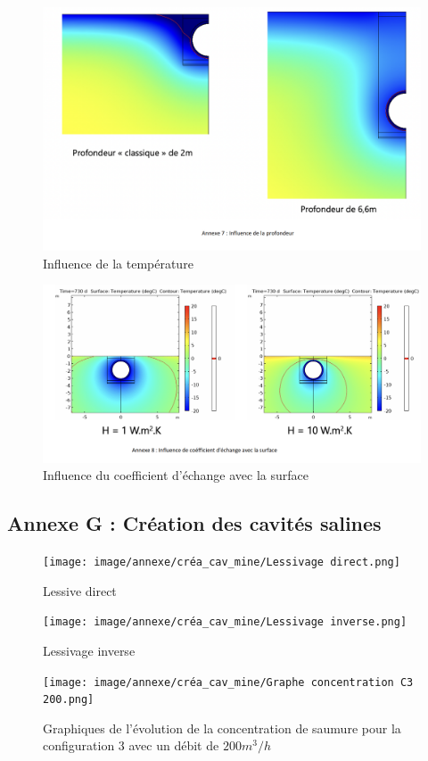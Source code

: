 \documentclass[11pt,french,a4paper]{article}
\begin{document}
\begin{figure}[!h]
\centering
\includegraphics[width=.8\linewidth]{image/annexe/reservoir_ent/Annexe_7.png}
\caption{Influence de la température}
\end{figure}
  
\begin{figure}[!h]
\centering
\includegraphics[width=.8\linewidth]{image/annexe/reservoir_ent/Annexe_9.png}
\caption{Influence du coefficient d'échange avec la surface}
\end{figure}

\FloatBarrier
\newpage
\subsection*{Annexe G : Création des cavités salines} 

\begin{figure}[!h]
  \centering
  \texttt{[image: image/annexe/créa\_cav\_mine/Lessivage direct.png]}
  \caption{Lessive direct}
  \end{figure}

\begin{figure}[!h]
  \centering
  \texttt{[image: image/annexe/créa\_cav\_mine/Lessivage inverse.png]}
  \caption{Lessivage inverse}
  \end{figure}

\begin{figure}[!h]
  \centering
  \texttt{[image: image/annexe/créa\_cav\_mine/Graphe concentration C3 200.png]}
  \caption{Graphiques de l'évolution de la concentration de saumure pour la configuration 3 avec un débit de $200m^3/h$}
  \end{figure}
\end{document}
